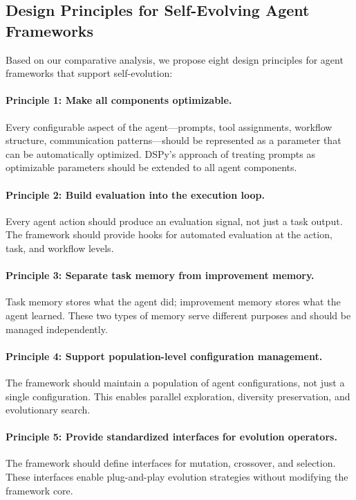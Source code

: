 \subsection{Design Principles for Self-Evolving Agent Frameworks}

Based on our comparative analysis, we propose eight design principles for agent frameworks that support self-evolution:

\paragraph{Principle 1: Make all components optimizable.}
Every configurable aspect of the agent---prompts, tool assignments, workflow structure, communication patterns---should be represented as a parameter that can be automatically optimized. DSPy's approach of treating prompts as optimizable parameters should be extended to all agent components.

\paragraph{Principle 2: Build evaluation into the execution loop.}
Every agent action should produce an evaluation signal, not just a task output. The framework should provide hooks for automated evaluation at the action, task, and workflow levels.

\paragraph{Principle 3: Separate task memory from improvement memory.}
Task memory stores what the agent did; improvement memory stores what the agent learned. These two types of memory serve different purposes and should be managed independently.

\paragraph{Principle 4: Support population-level configuration management.}
The framework should maintain a population of agent configurations, not just a single configuration. This enables parallel exploration, diversity preservation, and evolutionary search.

\paragraph{Principle 5: Provide standardized interfaces for evolution operators.}
The framework should define interfaces for mutation, crossover, and selection. These interfaces enable plug-and-play evolution strategies without modifying the framework core.

